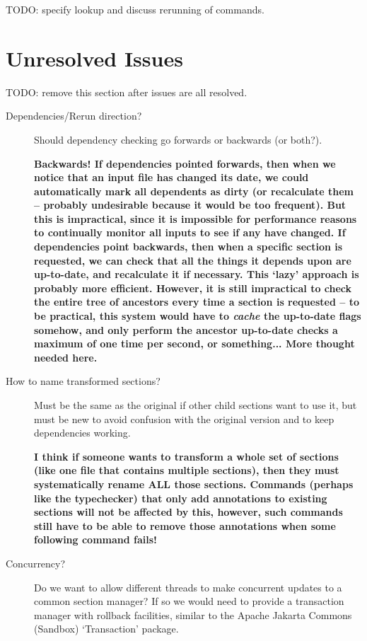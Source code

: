 \documentclass{llncs} %
\begin{document}
TODO: specify lookup and discuss rerunning of commands.  


\section{Unresolved Issues}

TODO: remove this section after issues are all resolved.

\begin{description}
\item[Dependencies/Rerun direction?]  Should dependency checking
  go forwards or backwards (or both?).

  \textbf{Backwards!  If dependencies pointed forwards, then when we
    notice that an input file has changed its date, we could automatically
    mark all dependents as dirty (or recalculate them -- probably undesirable
    because it would be too frequent).  But this is impractical, since it
    is impossible for performance reasons to continually monitor all inputs
    to see if any have changed.  If dependencies point backwards, then
    when a specific section is requested, we can check that all the
    things it depends upon are up-to-date, and recalculate it if
    necessary.  This `lazy' approach is probably more efficient.
    However, it is still impractical to check the entire tree of
    ancestors every time a section is requested -- to be practical,
    this system would have to \emph{cache} the up-to-date flags somehow,
    and only perform the ancestor up-to-date checks a maximum of
    one time per second, or something...  More thought needed here.}

\item[How to name transformed sections?]  Must be the same as the
  original if other child sections want to use it, but must
  be new to avoid confusion with the original version and
  to keep dependencies working.

  \textbf{I think if someone wants to transform a whole set of
    sections (like one file that contains multiple sections), then
    they must systematically rename ALL those sections. Commands
    (perhaps like the typechecker) that only add annotations to
    existing sections will not be affected by this, however, such
    commands still have to be able to remove those annotations
    when some following command fails!}

\item[Concurrency?]  Do we want to allow different threads to
  make concurrent updates to a common section manager?  If so
  we would need to provide a transaction manager with rollback
  facilities, similar to the Apache Jakarta Commons (Sandbox) `Transaction'
  package.  
  

\end{description}
\end{document}
